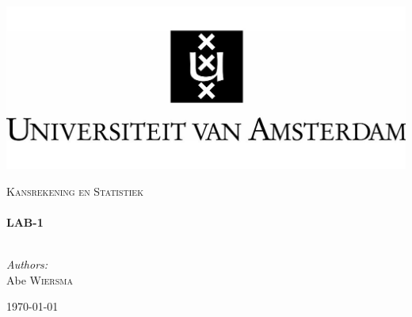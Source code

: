 \begin{titlepage}

\begin{flushleft}
\includegraphics[trim=23mm 0mm 0mm 0mm, width=1\textwidth]{./logo.jpg}\\[1cm] \end{flushleft}
\begin{center}
	\textsc{\Large Kansrekening en Statistiek}\\[0.5cm]

    \HRule \\[0.4cm] { \huge \bfseries LAB-1}\\[0.4cm]

    \HRule \\[1.5cm]

\begin{minipage}{0.4\textwidth}
\begin{flushleft} \large \emph{Authors:}\\
Abe \textsc{Wiersma}\\
\end{flushleft}
\end{minipage}
\begin{minipage}{0.4\textwidth} \begin{flushright} \large \end{flushright}\end{minipage}

    \vfill

    {\large \today}

\end{center}
\end{titlepage}
\pagebreak